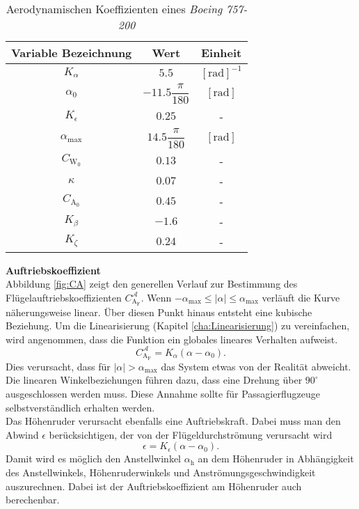 \begin{table}[h]
\centering
 \begin{tabular}{||c c c  ||} 
 \hline
 Variable Bezeichnung & Wert & Einheit\\ 
 \hline\hline
 $K_\alpha$ & $5.5$ & $\mathrm{[rad]^{-1}}$ \\ 
 \hline
 $\alpha_0$ & $-11.5\dfrac{\pi}{180}$ & $\mathrm{[rad]}$ \\ 
 \hline
 $K_{\epsilon}$ & $0.25$ & - \\ 
 \hline
 $\alpha_\mathrm{max}$ & $14.5\dfrac{\pi}{180}$ & $\mathrm{[rad]}$ \\ 
 \hline
 $C_\mathrm{W_0}$ & $0.13$ & - \\ 
 \hline
 $\kappa$ & $0.07$ & -\\ 
 \hline
 $C_\mathrm{A_0}$ & $0.45$ & -\\ 
 \hline
 $K_\beta$ & $-1.6$ & -\\  
 \hline
 $K_\zeta$ & $0.24$ & -\\ 
 \hline
\end{tabular}
\caption{Aerodynamischen Koeffizienten eines \textit{Boeing 757-200}}
\label{tab:KonstBeiw}
\end{table}
\textbf{Auftriebskoeffizient}\\
Abbildung \ref{fig:CA} zeigt den generellen Verlauf zur Bestimmung des Flügelauftriebskoeffizienten $C_\mathrm{A_F}^\mathcal{A}$. Wenn $-\alpha_\mathrm{max}\leq|\alpha|\leq\alpha_\mathrm{max}$ verläuft die Kurve näherungsweise linear. Über diesen Punkt hinaus entsteht eine kubische Beziehung. Um die Linearisierung (Kapitel \ref{cha:Linearisierung}) zu vereinfachen, wird angenommen, dass die Funktion ein globales lineares Verhalten aufweist.
\begin{equation}
C_\mathrm{A_F}^\mathcal{A} = K_\alpha(\alpha - \alpha_0).
\end{equation} 
Dies verursacht, dass für $|\alpha|> \alpha_\mathrm{max}$ das System etwas von der Realität abweicht. Die linearen Winkelbeziehungen führen dazu, dass eine Drehung über $90^{\circ}$  ausgeschlossen werden muss. Diese Annahme sollte für Passagierflugzeuge selbstverständlich erhalten werden.\\
Das Höhenruder verursacht ebenfalls eine Auftriebskraft. Dabei muss man den Abwind $\epsilon$ berücksichtigen, der von der Flügeldurchströmung verursacht wird
\begin{equation}
\epsilon = K_{\epsilon}(\alpha-\alpha_\mathrm{0}).
\end{equation}
Damit wird es möglich den Anstellwinkel $\alpha_\mathrm{h}$ an dem Höhenruder in Abhängigkeit des Anstellwinkels, Höhenruderwinkels und Anströmungsgeschwindigkeit auszurechnen. Dabei ist der Auftriebskoeffizient am Höhenruder auch berechenbar.

